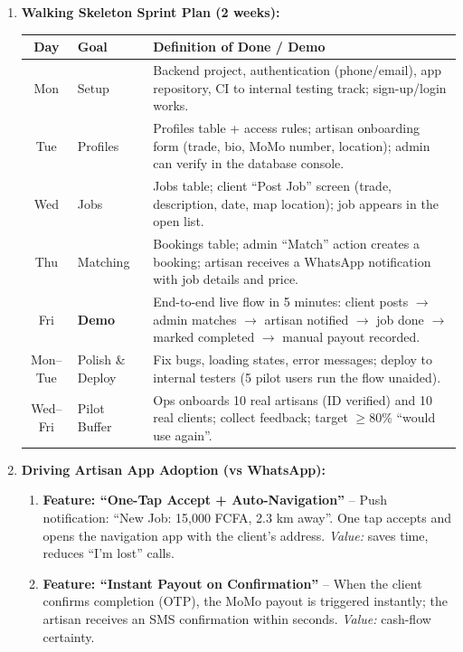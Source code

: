 \documentclass[11pt]{article}
\begin{document}
\begin{exoresolu}
\begin{enumerate}
\begin{center}
\begin{tabularx}{\linewidth}{|l|X|}
    \end{tabularx}
    \end{center}
    \item \textbf{Walking Skeleton Sprint Plan (2 weeks):}
    \begin{center}
    \begin{tabularx}{\linewidth}{|c|l|X|}\hline
    \rowcolor{popblueL} \textbf{Day} & \textbf{Goal} & \textbf{Definition of Done / Demo} \\ \hline
    Mon & Setup & Backend project, authentication (phone/email), app repository, CI to internal testing track; sign-up/login works. \\ \hline
    Tue & Profiles & Profiles table + access rules; artisan onboarding form (trade, bio, MoMo number, location); admin can verify in the database console. \\ \hline
    Wed & Jobs & Jobs table; client ``Post Job'' screen (trade, description, date, map location); job appears in the open list. \\ \hline
    Thu & Matching & Bookings table; admin ``Match'' action creates a booking; artisan receives a WhatsApp notification with job details and price. \\ \hline
    Fri & \textbf{Demo} & End-to-end live flow in 5 minutes: client posts $\to$ admin matches $\to$ artisan notified $\to$ job done $\to$ marked completed $\to$ manual payout recorded. \\ \hline
    Mon--Tue & Polish \& Deploy & Fix bugs, loading states, error messages; deploy to internal testers (5 pilot users run the flow unaided). \\ \hline
    Wed--Fri & Pilot Buffer & Ops onboards 10 real artisans (ID verified) and 10 real clients; collect feedback; target $\ge 80\%$ ``would use again''. \\ \hline
    \end{tabularx}
    \end{center}
    \item \textbf{Driving Artisan App Adoption (vs WhatsApp):}
    \begin{enumerate}
        \item \textbf{Feature: ``One-Tap Accept + Auto-Navigation''} -- Push notification: ``New Job: 15,000 FCFA, 2.3 km away''. One tap accepts and opens the navigation app with the client's address. \emph{Value:} saves time, reduces ``I'm lost'' calls.
        \item \textbf{Feature: ``Instant Payout on Confirmation''} -- When the client confirms completion (OTP), the MoMo payout is triggered instantly; the artisan receives an SMS confirmation within seconds. \emph{Value:} cash-flow certainty.

\end{enumerate}
\end{enumerate}
\end{exoresolu}
\end{document}
